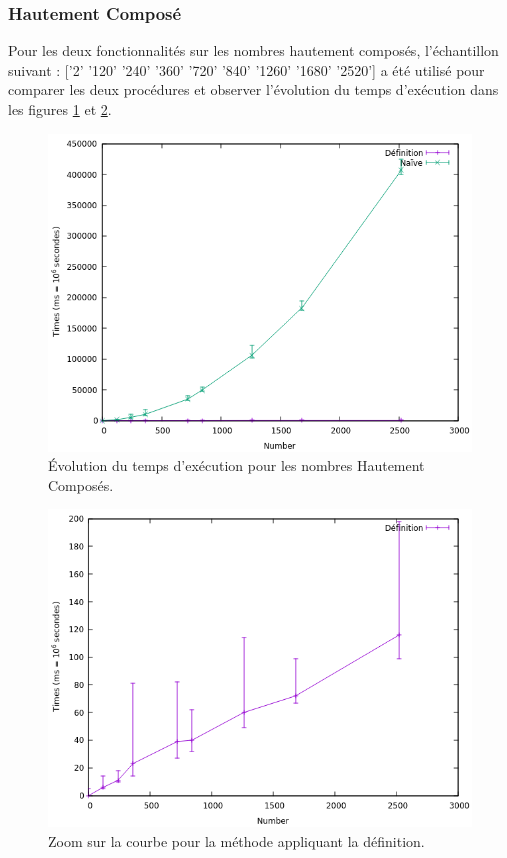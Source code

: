 	\subsubsection{Hautement Composé}
	Pour les deux fonctionnalités sur les nombres hautement composés, l'échantillon suivant : ['2' '120' '240' '360' '720' '840' '1260' '1680' '2520'] a été utilisé pour comparer les deux procédures et observer l'évolution du temps d'exécution dans les figures \ref{fg:HC} et \ref{fg:HCdef}.\\
	\begin{figure}[!ht]	
		\begin{center}\includegraphics[scale=0.5]{HC.png}\end{center}
		\caption{Évolution du temps d'exécution pour les nombres Hautement Composés.}
		\label{fg:HC}
	\end{figure}
	\begin{figure}[!ht]	
		\begin{center}\includegraphics[scale=0.5]{HCdef.png}\end{center}
		\caption{Zoom sur la courbe pour la méthode appliquant la définition.}
		\label{fg:HCdef}
	\end{figure}
